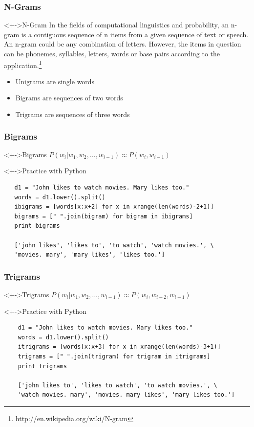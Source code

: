 \documentclass[serif,11pt,aspectratio=1610,table]{beamer}
\begin{document}
\begin{frame}[fragile]
 \frametitle{N-Grams}
\begin{block}<+->{N-Gram}
 In the fields of computational linguistics and probability, an n-gram is a contiguous sequence of n items from a given sequence of text or speech. An n-gram could be any combination of letters. However, the items in question can be phonemes, syllables, letters, words or base pairs according to the application.\footnote{http://en.wikipedia.org/wiki/N-gram} \\
 \begin{itemize}
  \item Unigrams are single words
  \item Bigrams are sequences of two words
  \item Trigrams are sequences of three words
 \end{itemize}

\end{block}

\end{frame}

\begin{frame}[fragile]
 \frametitle{Bigrams}
 \begin{block}<+->{Bigrams}
  $ P(w_{i}|w_{1},w_{2},...,w_{i-1})  \approx P(w_{i},w_{i-1})$
 \end{block}
 \begin{block}<+->{Practice with Python}
  \footnotesize
  \begin{Verbatim}
   d1 = "John likes to watch movies. Mary likes too."
   words = d1.lower().split()
   ibigrams = [words[x:x+2] for x in xrange(len(words)-2+1)]
   bigrams = [" ".join(bigram) for bigram in ibigrams]
   print bigrams

   ['john likes', 'likes to', 'to watch', 'watch movies.', \
   'movies. mary', 'mary likes', 'likes too.']
  \end{Verbatim}

 \end{block}

\end{frame}

\begin{frame}[fragile]
 \frametitle{Trigrams}
 \begin{block}<+->{Trigrams}
  $ P(w_{i}|w_{1},w_{2},...,w_{i-1})  \approx P(w_{i},w_{i-2},w_{i-1})$
 \end{block}
 \begin{block}<+->{Practice with Python}
  \footnotesize
   \begin{Verbatim}
    d1 = "John likes to watch movies. Mary likes too."
    words = d1.lower().split()
    itrigrams = [words[x:x+3] for x in xrange(len(words)-3+1)]
    trigrams = [" ".join(trigram) for trigram in itrigrams]
    print trigrams

    ['john likes to', 'likes to watch', 'to watch movies.', \
    'watch movies. mary', 'movies. mary likes', 'mary likes too.']
   \end{Verbatim}

 \end{block}


\end{frame}
\end{document}
